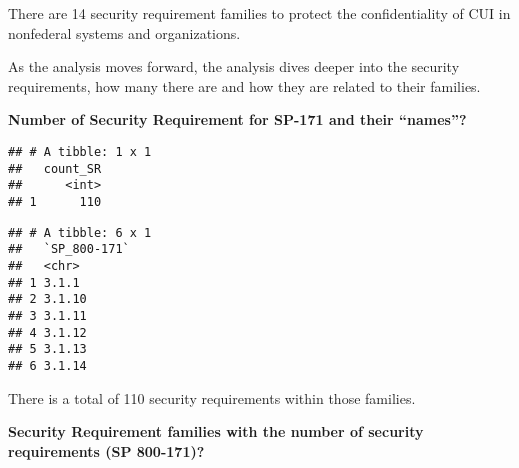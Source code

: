 \documentclass[]{article}
\newenvironment{Shaded}{\begin{snugshade}}{\end{snugshade}}
\newcommand{\KeywordTok}[1]{\textcolor[rgb]{0.13,0.29,0.53}{\textbf{#1}}}
\newcommand{\DataTypeTok}[1]{\textcolor[rgb]{0.13,0.29,0.53}{#1}}
\newcommand{\DecValTok}[1]{\textcolor[rgb]{0.00,0.00,0.81}{#1}}
\newcommand{\StringTok}[1]{\textcolor[rgb]{0.31,0.60,0.02}{#1}}
\newcommand{\OperatorTok}[1]{\textcolor[rgb]{0.81,0.36,0.00}{\textbf{#1}}}
\newcommand{\NormalTok}[1]{#1}
\begin{document}
There are 14 security requirement families to protect the
confidentiality of CUI in nonfederal systems and organizations.

As the analysis moves forward, the analysis dives deeper into the
security requirements, how many there are and how they are related to
their families.

\textbf{Number of Security Requirement for SP-171 and their ``names''?}

\begin{Shaded}
\end{Shaded}

\begin{verbatim}
## # A tibble: 1 x 1
##   count_SR
##      <int>
## 1      110
\end{verbatim}

\begin{Shaded}
\end{Shaded}

\begin{verbatim}
## # A tibble: 6 x 1
##   `SP_800-171`
##   <chr>       
## 1 3.1.1       
## 2 3.1.10      
## 3 3.1.11      
## 4 3.1.12      
## 5 3.1.13      
## 6 3.1.14
\end{verbatim}

There is a total of 110 security requirements within those families.

\textbf{Security Requirement families with the number of security
requirements (SP 800-171)?}

\begin{Shaded}
\end{Shaded}
\end{document}
